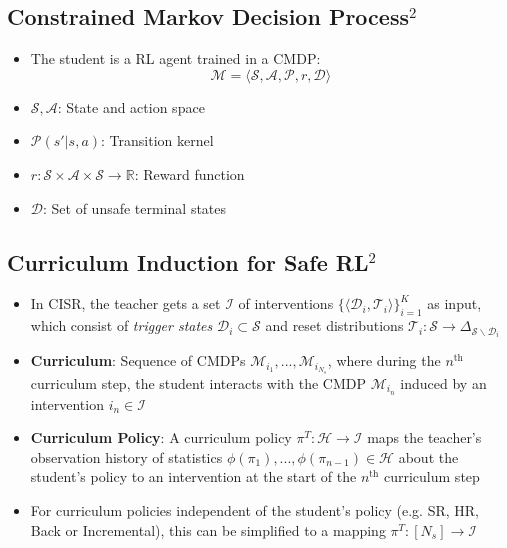 \documentclass[a0,portrait]{a0poster}
\begin{document}
\begin{multicols}{3}
\subsection{Constrained Markov Decision Process$^\text{2}$}

\begin{itemize}
    \item The student is a RL agent trained in a CMDP:
    \begin{equation*}
        \mathcal{M} = \langle \mathcal{S},\mathcal{A},\mathcal{P},r,\mathcal{D} \rangle
    \end{equation*}
    \item $\mathcal{S}, \mathcal{A}$: State and action space
    \item $\mathcal{P}(s'|s,a)$: Transition kernel
    \item $r:\mathcal{S}\times\mathcal{A}\times\mathcal{S}\rightarrow\mathbb{R}$: Reward function
    \item $\mathcal{D}$: Set of unsafe terminal states
\end{itemize}

\subsection{Curriculum Induction for Safe RL$^\text{2}$}

\begin{itemize}
    \item In CISR, the teacher gets a set $\mathcal{I}$ of interventions $\{ \langle \mathcal{D}_i, \mathcal{T}_i \rangle \}_{i=1}^K$ as input, which consist of \emph{trigger states} $\mathcal{D}_i \subset \mathcal{S}$ and reset distributions $\mathcal{T}_i: \mathcal{S} \rightarrow \Delta_{\mathcal{S} \backslash \mathcal{D}_i}$
    \item \textbf{Curriculum}: Sequence of CMDPs $\mathcal{M}_{i_1},...,\mathcal{M}_{i_{N_s}}$, where during the $n^{\text{th}}$ curriculum step, the student interacts with the CMDP $\mathcal{M}_{i_n}$ induced by an intervention $i_n\in\mathcal{I}$
    \item \textbf{Curriculum Policy}: A curriculum policy $\pi^T: \mathcal{H} \rightarrow \mathcal{I}$ maps the teacher's observation history of statistics $\phi(\pi_1),...,\phi(\pi_{n-1})\in\mathcal{H}$ about the student's policy to an intervention at the start of the $n^{\text{th}}$ curriculum step
    \item For curriculum policies independent of the student's policy (e.g. SR, HR, Back or Incremental), this can be simplified to a mapping $\pi^T:[N_s]\rightarrow \mathcal{I}$
\end{itemize}


\end{multicols}
\end{document}

